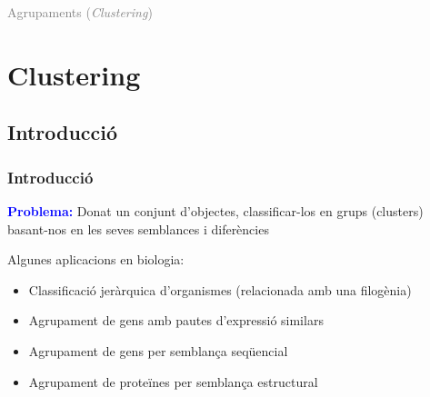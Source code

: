 \documentclass[12pt,t]{beamer}
\title[\red{Matemàtiques III}]{}
\author[]{}
\date{}
\newcommand{\blue}[1]{\textcolor{blue}{#1}}
\newcommand{\gray}[1]{\textcolor{gray}{#1}}
\renewcommand{\emph}[1]{{\color{red}#1}}
\theoremstyle{plain}
\theoremstyle{definition}
\begin{document}
\beamertemplatedotitem

\lstset{breaklines=true}
\lstset{basicstyle=\ttfamily}
\lstset{extendedchars=true}
\lstset{showstringspaces=false}

\begin{frame}
\vfill
\begin{center}
\gray{\LARGE Agrupaments (\textsl{Clustering})}
\end{center}
\vfill
\end{frame}
\section{Clustering}
\subsection{Introducció}
\begin{frame}
\frametitle{Introducció}

\blue{\bf Problema:} Donat un conjunt d'objectes, classificar-los en grups (\emph{clusters})  basant-nos en les seves semblances i diferències
\medskip

Algunes aplicacions en biologia:
\begin{itemize}
\item Classificació jeràrquica d'organismes (relacionada amb una filogènia)

\item Agrupament de gens amb pautes d'expressió similars

\item Agrupament de gens per semblança seqüencial

\item Agrupament de proteïnes per semblança estructural
\end{itemize}
\end{frame}
\end{document}
